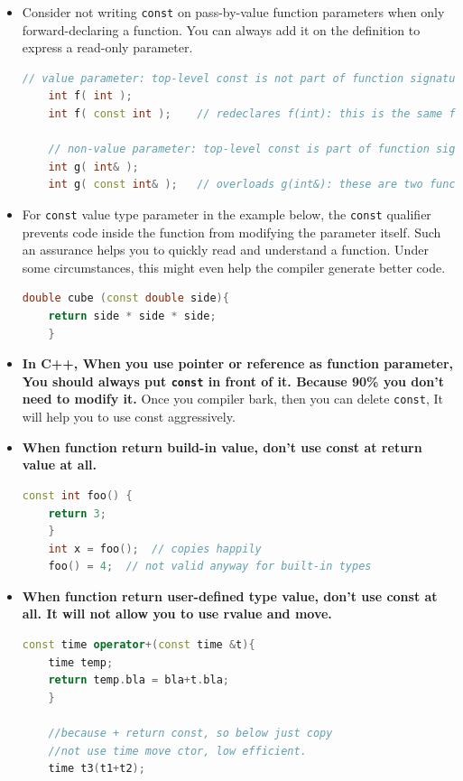 \documentclass[a4paper,11pt,twoside]{book}
\begin{document}
\begin{itemize}
	\item  Consider not writing \texttt{const} on pass-by-value function parameters when only forward-declaring a function. You can always add it on the definition to express a read-only parameter.
	\begin{lstlisting}[frame=single, language=c++]
	// value parameter: top-level const is not part of function signature
	int f( int );
	int f( const int );    // redeclares f(int): this is the same function
	
	// non-value parameter: top-level const is part of function signature
	int g( int& );
	int g( const int& );   // overloads g(int&): these are two functions
	\end{lstlisting}
	
	\item For \texttt{const} value type parameter in the example below, the \texttt{const} qualifier prevents code inside the function from modifying the parameter itself. Such an assurance helps you to quickly read and understand a function. Under some circumstances, this might even help the compiler generate better code. 
	\begin{lstlisting}[frame=single, language=c++]
	double cube (const double side){
	return side * side * side;
	}
	\end{lstlisting}
	
	\item \textbf{In C++, When you use pointer or reference as function parameter, You should always put \texttt{const} in front of it. Because 90\% you don't need to modify it. } Once you compiler bark, then you can delete \texttt{const}, It will help you to use const aggressively.
	
	\item \textbf{When function return build-in value, don't use const at return value at all. }
	\begin{lstlisting}[frame=single, language=c++]
	const int foo() {
	return 3;
	}
	int x = foo();  // copies happily
	foo() = 4;  // not valid anyway for built-in types
	\end{lstlisting}
	
	\item \textbf{When function return user-defined type value, don't use const at all. It will not allow you to use rvalue and move. }
	\begin{lstlisting}[frame=single, language=c++]
	const time operator+(const time &t){
	time temp;
	return temp.bla = bla+t.bla;
	}
	
	//because + return const, so below just copy
	//not use time move ctor, low efficient.
	time t3(t1+t2);
	\end{lstlisting}
	

\end{itemize}
\end{document}
